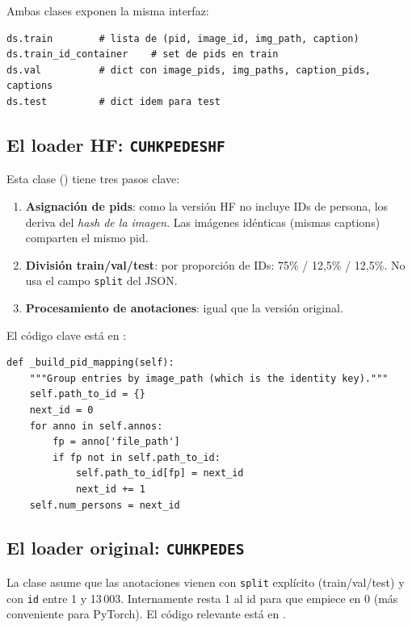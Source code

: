 Ambas clases exponen la misma interfaz:

\begin{verbatim}
ds.train        # lista de (pid, image_id, img_path, caption)
ds.train_id_container    # set de pids en train
ds.val          # dict con image_pids, img_paths, caption_pids, captions
ds.test         # dict idem para test
\end{verbatim}

\subsection{El loader HF: \texttt{CUHKPEDESHF}}

Esta clase () tiene tres pasos
clave:

\begin{enumerate}
  \item \textbf{Asignación de pids}: como la versión HF no
        incluye IDs de persona, los deriva del \emph{hash de la
        imagen}. Las imágenes idénticas (mismas captions)
        comparten el mismo pid.
  \item \textbf{División train/val/test}: por proporción de IDs:
        75\% / 12,5\% / 12,5\%. No usa el campo
        \texttt{split} del JSON.
  \item \textbf{Procesamiento de anotaciones}: igual que la
        versión original.
\end{enumerate}

\noindent El código clave está en :

\begin{verbatim}
def _build_pid_mapping(self):
    """Group entries by image_path (which is the identity key)."""
    self.path_to_id = {}
    next_id = 0
    for anno in self.annos:
        fp = anno['file_path']
        if fp not in self.path_to_id:
            self.path_to_id[fp] = next_id
            next_id += 1
    self.num_persons = next_id
\end{verbatim}

\subsection{El loader original: \texttt{CUHKPEDES}}

La clase  asume que las anotaciones
vienen con \texttt{split} explícito (train/val/test) y con
\texttt{id} entre 1 y 13\,003. Internamente resta 1 al id para
que empiece en 0 (más conveniente para PyTorch). El código
relevante está en .

